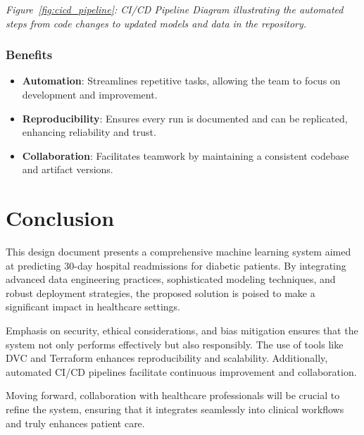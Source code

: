 \documentclass{article}
\begin{document}
\textit{Figure~\ref{fig:cicd_pipeline}: CI/CD Pipeline Diagram illustrating the automated steps from code changes to updated models and data in the repository.}

\subsubsection{Benefits}

\begin{itemize}[leftmargin=*]
    \item \textbf{Automation}: Streamlines repetitive tasks, allowing the team to focus on development and improvement.
    \item \textbf{Reproducibility}: Ensures every run is documented and can be replicated, enhancing reliability and trust.
    \item \textbf{Collaboration}: Facilitates teamwork by maintaining a consistent codebase and artifact versions.
\end{itemize}

\section{Conclusion}

This design document presents a comprehensive machine learning system aimed at predicting 30-day hospital readmissions for diabetic patients. By integrating advanced data engineering practices, sophisticated modeling techniques, and robust deployment strategies, the proposed solution is poised to make a significant impact in healthcare settings.

Emphasis on security, ethical considerations, and bias mitigation ensures that the system not only performs effectively but also responsibly. The use of tools like DVC and Terraform enhances reproducibility and scalability. Additionally, automated CI/CD pipelines facilitate continuous improvement and collaboration.

Moving forward, collaboration with healthcare professionals will be crucial to refine the system, ensuring that it integrates seamlessly into clinical workflows and truly enhances patient care.

\nocite{*}
\printbibliography
\end{document}
